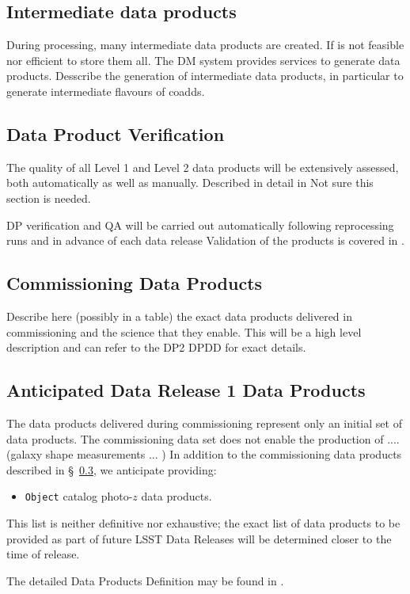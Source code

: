 \subsection{Intermediate data products}
During processing, many intermediate data products are created. If is not feasible nor efficient to store them all.
The DM system provides services to generate data products.
Desscribe the generation of intermediate data products, in particular to generate intermediate flavours of coadds.


\subsection{Data Product Verification}
The quality of all Level 1 and Level 2 data products will be extensively assessed, both automatically as well as manually.
Described in detail in \citet{PSTN-024}
Not sure this section is needed.

DP verification and QA will be carried out automatically following reprocessing runs and in advance of each data release
Validation of the products is covered in \citet{PSTN-024}.

\subsection{Commissioning Data Products}  \label{sec:dp-commissioning}
Describe here (possibly in a table) the exact data products delivered in commissioning and the science that they enable.
This will be a high level description and can refer to the DP2 DPDD for exact details.

\subsection{Anticipated Data Release 1 Data Products} \label{sec:dp-dr1}

The data products delivered during commissioning represent only an initial set of data products.
The commissioning data set does not enable the production of .... (galaxy shape measurements ... )
In addition to the commissioning data products described in \S~\ref{sec:dp-commissioning}, we anticipate providing:

\begin{itemize}
\item {\tt Object} catalog photo-$z$ data products.
\end{itemize}
This list is neither definitive nor exhaustive; the exact list of data products to be provided as part of future LSST Data Releases will be determined closer to the time of release.

The detailed  Data Products Definition may be found in  \citet{LSE-163}.

